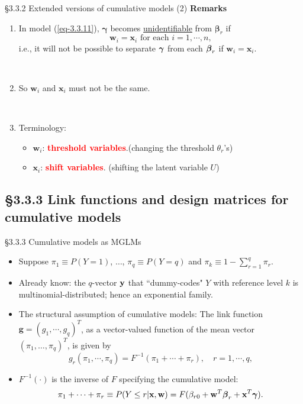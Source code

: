 \documentclass{beamer}
\newcommand{\currentsubsection}{}
\let\oldsubsection\subsection
\renewcommand{\subsection}[1]{\oldsubsection{#1}\renewcommand{\currentsubsection}{#1}}
\newcommand{\boldbeta}{{\boldsymbol \beta}}
\newcommand{\boldgamma}{{\boldsymbol \gamma}}
\newenvironment{wideitemize}%
  {\begin{itemize}%
    \setlength{\parskip}{1em}}%
  {\end{itemize}}
\begin{document}
\begin{frame}{\S3.3.2 Extended versions of cumulative models (2)}
\textbf{Remarks}
\begin{enumerate}
\item
In model (\ref{eq-3.3.11}), $\boldgamma$ becomes \underline{unidentifiable} from $\boldbeta_r$ if 
\[
\textbf{w}_i=\textbf{x}_i \text{ for each } i=1,\cdots,n, 
\]
i.e., it will not be possible to separate $\mbox{\boldmath $\gamma$}$ from
each $\mbox{\boldmath $\beta$}_r$ if $\textbf{w}_i=\textbf{x}_i$.

\ \

\item
So $\textbf{w}_i$ and $\textbf{x}_i$ must not be the same.

%

\ \

\item Terminology: 
\begin{wideitemize} \item
$\textbf{w}_i$:  \textbf{\textcolor{red}{threshold variables}}.(changing the threshold $\theta_r$'s)
 \item $\textbf{x}_i$:   
\textbf{\textcolor{red}{shift variables}}. (shifting the latent variable $U$)
\end{wideitemize}
\end{enumerate}
\end{frame}

\subsection{\S3.3.3 Link functions and design matrices for cumulative models}\label{sec:3.3.3}
\begin{frame}{\S3.3.3 Cumulative models as MGLMs}
\begin{wideitemize}

\item Suppose $\pi_1 \equiv P(Y\!=\!1)$, $\dots$, $\pi_q \equiv P(Y\!=\!q)$ and $\pi_k \equiv 1 - \sum_{r =1}^q \pi_r$.

\item Already know:   the  $q$-vector ${\bf y}$ that ``dummy-codes" $Y$ with reference level $k$ is multinomial-distributed; hence an exponential family.


\item The structural assumption of cumulative models: The link function $\mathbf{g}\!=\!(g_1,\cdots, g_q)^T$,
as a vector-valued  function of the mean vector $(\pi_1, \dots, \pi_q)^T$, is given by
$$g_r(\pi_1,\cdots,\pi_q)=F^{-1}(\pi_1+\cdots+\pi_r), \quad r=1,\cdots,q,$$

\item $F^{-1}(\cdot)$ is the inverse  of $F$ specifying the cumulative model:
\[
\pi_1+\cdots+\pi_r   \equiv P(Y\leq r|\textbf{x}, \textbf{w})=F(\beta_{r0}+\textbf{w}^T\mbox{\boldmath $\beta$}_r+
\textbf{x}^T\mbox{\boldmath $\gamma$}).
\]


\end{wideitemize}
\end{frame}
\end{document}
